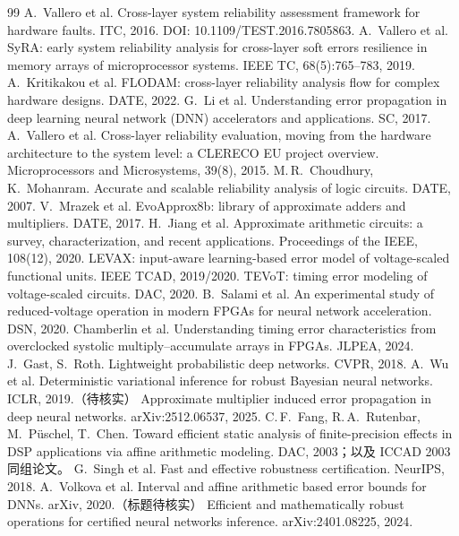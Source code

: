 \documentclass[11pt,a4paper]{ctexart}
\begin{document}
\begin{thebibliography}{99}
 A.~Vallero et al. Cross-layer system reliability assessment framework for hardware faults. ITC, 2016. DOI: 10.1109/TEST.2016.7805863.
 A.~Vallero et al. SyRA: early system reliability analysis for cross-layer soft errors resilience in memory arrays of microprocessor systems. IEEE TC, 68(5):765--783, 2019.
 A.~Kritikakou et al. FLODAM: cross-layer reliability analysis flow for complex hardware designs. DATE, 2022.
 G.~Li et al. Understanding error propagation in deep learning neural network (DNN) accelerators and applications. SC, 2017.
 A.~Vallero et al. Cross-layer reliability evaluation, moving from the hardware architecture to the system level: a CLERECO EU project overview. Microprocessors and Microsystems, 39(8), 2015.
 M.\,R.~Choudhury, K.~Mohanram. Accurate and scalable reliability analysis of logic circuits. DATE, 2007.
 V.~Mrazek et al. EvoApprox8b: library of approximate adders and multipliers. DATE, 2017.
 H.~Jiang et al. Approximate arithmetic circuits: a survey, characterization, and recent applications. Proceedings of the IEEE, 108(12), 2020.
 LEVAX: input-aware learning-based error model of voltage-scaled functional units. IEEE TCAD, 2019/2020.
 TEVoT: timing error modeling of voltage-scaled circuits. DAC, 2020.
 B.~Salami et al. An experimental study of reduced-voltage operation in modern FPGAs for neural network acceleration. DSN, 2020.
 Chamberlin et al. Understanding timing error characteristics from overclocked systolic multiply--accumulate arrays in FPGAs. JLPEA, 2024.
 J.~Gast, S.~Roth. Lightweight probabilistic deep networks. CVPR, 2018.
 A.~Wu et al. Deterministic variational inference for robust Bayesian neural networks. ICLR, 2019.（待核实）
 Approximate multiplier induced error propagation in deep neural networks. arXiv:2512.06537, 2025.
 C.\,F.~Fang, R.\,A.~Rutenbar, M.~Püschel, T.~Chen. Toward efficient static analysis of finite-precision effects in DSP applications via affine arithmetic modeling. DAC, 2003；以及 ICCAD 2003 同组论文。
 G.~Singh et al. Fast and effective robustness certification. NeurIPS, 2018.
 A.~Volkova et al. Interval and affine arithmetic based error bounds for DNNs. arXiv, 2020.（标题待核实）
 Efficient and mathematically robust operations for certified neural networks inference. arXiv:2401.08225, 2024.

\end{thebibliography}
\end{document}
